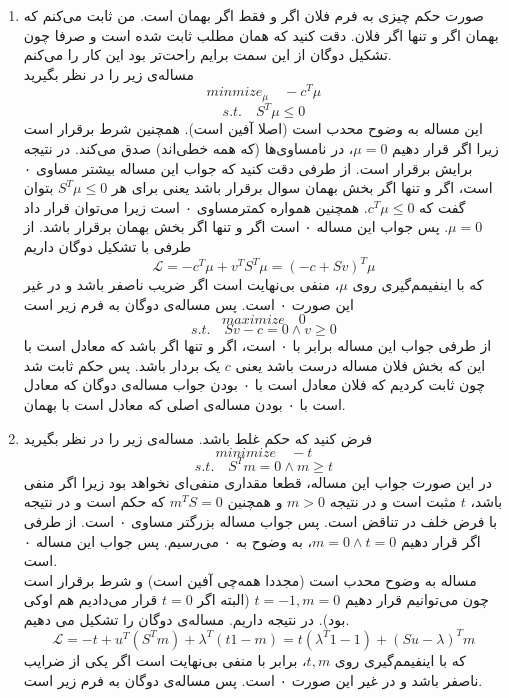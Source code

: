 \begin{enumerate}
	\item 
صورت حکم چیزی به فرم
فلان اگر و فقط اگر بهمان است. من ثابت می‌کنم که بهمان اگر و تنها اگر فلان. دقت کنید که همان مطلب ثابت شده است و صرفا چون تشکیل دوگان از این سمت برایم راحت‌تر بود این کار را می‌کنم.\\
مساله‌ی زیر را در نظر بگیرید
\[
minmize_{\mu} \quad -c^T\mu \]\[
s.t. \quad S^T\mu \le 0
\]
این مساله به وضوح محدب است (اصلا آفین است). همچنین شرط
برقرار است زیرا اگر قرار دهیم
$\mu = 0$،
در نامساوی‌ها (که همه خطی‌اند) صدق می‌کند. در نتیجه 
برایش برقرار است. از طرفی دقت کنید که جواب این مساله بیشتر مساوی ۰ است، اگر و تنها اگر 
بخش بهمان سوال برقرار باشد یعنی برای هر 
$S^T\mu \le 0$
بتوان گفت که 
$c^T\mu \le 0$.
همچنین همواره کمتر‌مساوی ۰ است زیرا می‌توان قرار داد
$\mu = 0$.
پس جواب این مساله ۰ است اگر و تنها اگر بخش بهمان برقرار باشد.
از طرفی با تشکیل دوگان داریم
\[
\mathcal{L} = -c^T\mu + v^TS^T\mu = (-c + Sv)^T\mu
\]
که با اینفیمم‌گیری روی $\mu$، منفی بی‌نهایت است اگر ضریب ناصفر باشد و در غیر این صورت ۰ است. پس مساله‌ی دوگان به فرم زیر است
\[
maximize \quad 0 \]\[
s.t. \quad Sv - c = 0 \land v \ge 0
\]
از طرفی جواب این مساله برابر با ۰ است، اگر و تنها اگر  باشد که معادل است با این که بخش فلان مساله درست باشد یعنی
$c$
یک بردار 
باشد. پس حکم ثابت شد چون ثابت کردیم که فلان معادل است با ۰ بودن جواب مساله‌ی دوگان که معادل است با 
 ۰ بودن مساله‌ی اصلی که معادل است با بهمان.
\item 
فرض کنید که حکم غلط باشد. مساله‌ی زیر را در نظر بگیرید
\[
minimize \quad -t\]\[
s.t. \quad S^Tm = 0 \land m \ge t
\]
در این صورت جواب این مساله، قطعا مقداری منفی‌ای نخواهد بود زیرا اگر منفی باشد، $t$ مثبت است و در نتیجه 
$m > 0$
و همچنین
$m^TS = 0$
که حکم است و در نتیجه با فرض خلف در تناقض است. پس جواب مساله بزرگتر مساوی ۰ است. از طرفی اگر قرار دهیم
$m = 0 \land t = 0$،
به وضوح به ۰ می‌رسیم. پس جواب این مساله ۰ است.\\
مساله به وضوح محدب است (مجددا همه‌چی آفین است) و شرط 
برقرار است چون می‌توانیم قرار دهیم
$t = -1, m = 0$
(البته اگر $t=0$ قرار می‌دادیم هم اوکی بود). در نتیجه 
داریم. مساله‌ی دوگان را تشکیل می دهیم.
\[
\mathcal{L} = -t + u^T(S^Tm) + \lambda^T(t1 - m) = 
t(\lambda^T1 - 1) + (Su - \lambda)^Tm 
\]
که با اینفیمم‌گیری روی $t, m$، برابر با منفی بی‌نهایت است اگر یکی از ضرایب ناصفر باشد و در غیر این صورت ۰ است. پس مساله‌ی دوگان به فرم زیر است.

\end{enumerate}
